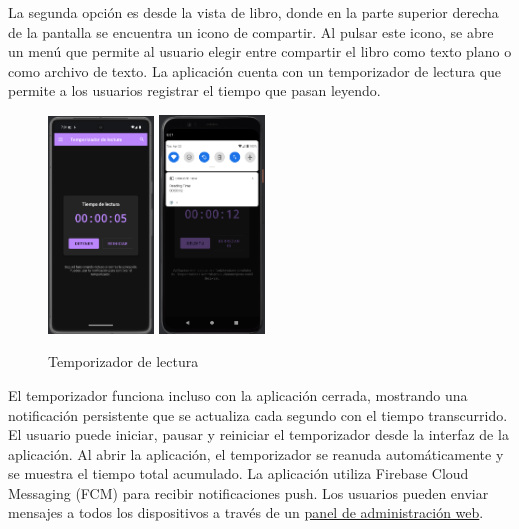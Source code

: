 \documentclass[a4paper,11pt]{report}
\begin{document}
      La segunda opción es desde la vista de libro, donde en la parte superior derecha de la pantalla se encuentra un icono de compartir. Al pulsar este icono, se abre un menú que permite al usuario elegir entre compartir el libro como texto plano o como archivo de texto.
      La aplicación cuenta con un temporizador de lectura que permite a los usuarios registrar el tiempo que pasan leyendo.
      \begin{figure}[H]
        \centering
        \includegraphics[width=0.25\textwidth]{.img/temporizador.png}
        \hspace{2cm}
        \includegraphics[width=0.25\textwidth]{.img/temporizador_2.png}
        \caption{Temporizador de lectura}
        \label{fig:temporizador}
      \end{figure}
      El temporizador funciona incluso con la aplicación cerrada, mostrando una notificación persistente que se actualiza cada segundo con el tiempo transcurrido.
      El usuario puede iniciar, pausar y reiniciar el temporizador desde la interfaz de la aplicación. Al abrir la aplicación, el temporizador se reanuda automáticamente y se muestra el tiempo total acumulado.
      La aplicación utiliza Firebase Cloud Messaging (FCM) para recibir notificaciones push. Los usuarios pueden enviar mensajes a todos los dispositivos a través de un \textcolor{blue}{\href{http://ec2-51-44-167-78.eu-west-3.compute.amazonaws.com/xgabina001/WEB/admin_panel.php}{panel de administración web}}.
\end{document}
